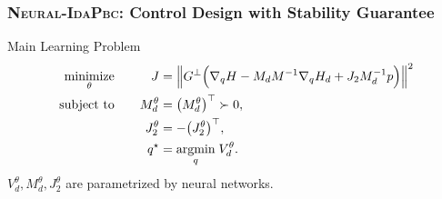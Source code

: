 \begin{frame}[fragile]
  \frametitle{ \textsc{Neural-IdaPbc}: Control Design with Stability Guarantee}
  \begin{exampleblock}{Main Learning Problem}
    \begin{equation*}
      \begin{aligned}
        \underset{\theta }{\text{minimize}} 
        &&\quad J &= \left\| G^\bot \Bigl( \nabla_q H - M_d M^{-1} \nabla_q H_d + J_2 M_d^{-1} p \Bigr) \right\|^2 \\
        \text{subject to} 
        &&\quad M_d^\theta &= \big( M_d^\theta \big)^\top \succ 0, \\
        &&\quad J_2^\theta &= -\big( J_2^\theta \big)^\top, \\
        &&\quad q^\star &= \underset{q}{\text{argmin}}\; V_d^\theta.
      \end{aligned}    
    \end{equation*}
    $V_d^\theta, M_d^\theta, J_2^\theta$ are 
    parametrized by neural networks.
  \end{exampleblock}
  
  
  
 
\end{frame}
